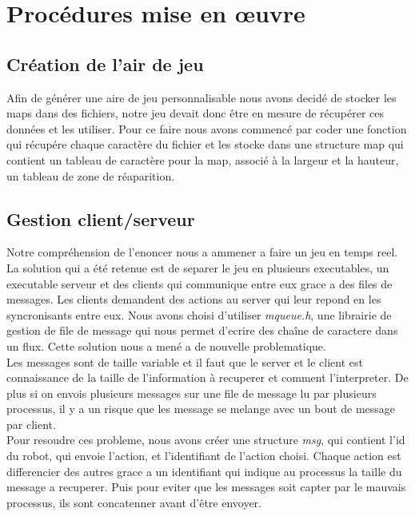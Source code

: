\documentclass[a4paper, 11pt]{article}
\title{\myfont {Robots programmables}}
\author{\huge {COTREZ Léo}\and \huge {ORNIACKI Thomas}\and \\Université Paris-VIII, Saint-Denis, France\and \\Licence 2 Informatique}
\date{Premier Semestre 2018}
\begin{document}
\maketitle

\newpage
\tableofcontents

\newpage
\section{Procédures mise en \oe uvre}
\subsection{Création de l'air de jeu}
Afin de générer une aire de jeu personnalisable nous avons decidé de stocker les maps dans des fichiers, notre jeu devait donc être en mesure de récupérer ces données et les utiliser. Pour ce faire nous avons commencé par coder une fonction qui récupére chaque caractère du fichier et les stocke dans une structure map qui contient un tableau de caractère pour la map, associé à la largeur et la hauteur, un tableau de zone de réaparition.\\
\subsection{Gestion client/serveur}
Notre compréhension de l'enoncer nous a ammener a faire un jeu en temps reel. La solution qui a été retenue est de separer le jeu en plusieurs executables, un executable serveur et des clients qui communique entre eux grace a des files de messages. Les clients demandent des actions au server qui leur repond en les syncronisants entre eux. Nous avons choisi d'utiliser \emph{mqueue.h}, une librairie de gestion de file de message qui nous permet d'ecrire des chaîne de caractere dans un flux. Cette solution nous a mené a de nouvelle problematique.\\
Les messages sont de taille variable et il faut que le server et le client est connaissance de la taille de l'information à recuperer et comment l'interpreter. De plus si on envois plusieurs messages sur une file de message lu par plusieurs processus, il y a un risque que les message se melange avec un bout de message par client.\\
Pour resoudre ces probleme, nous avons créer une structure \emph{msg}, qui contient l'id du robot, qui envoie l'action, et l'identifiant de l'action choisi. Chaque action est differencier des autres grace a un identifiant qui indique au processus la taille du message a recuperer. Puis pour eviter que les messages soit capter par le mauvais processus, ils sont concatenner avant d'être envoyer.\\
\end{document}
